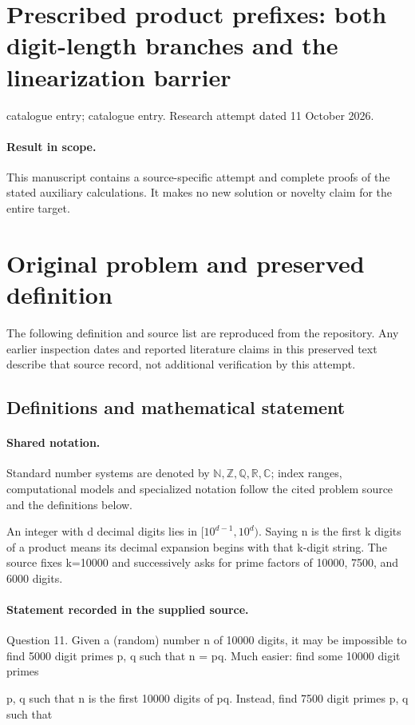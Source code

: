 \documentclass[11pt]{article}
\begin{document}
\section*{Prescribed product prefixes: both digit-length branches and the linearization barrier}
\noindent catalogue entry; catalogue entry. Research attempt dated 11 October 2026.
\paragraph{Result in scope.}This manuscript contains a source-specific attempt and complete proofs of the stated auxiliary calculations. It makes no new solution or novelty claim for the entire target.
\section{Original problem and preserved definition}
The following definition and source list are reproduced from the repository. Any earlier inspection dates and reported literature claims in this preserved text describe that source record, not additional verification by this attempt.
\subsection{Definitions and mathematical statement}

\paragraph{Shared notation.}Standard number systems are denoted by $\mathbb N,\mathbb Z,\mathbb Q,\mathbb R,\mathbb C$; index ranges, computational models and specialized notation follow the cited problem source and the definitions below.


An integer with d decimal digits lies in $[10^{d-1},10^d)$. Saying n is the first k digits of a product means its decimal expansion begins with that k-digit string. The source fixes k=10000 and successively asks for prime factors of 10000, 7500, and 6000 digits.
\paragraph{Statement recorded in the supplied source.}
Question 11. Given a (random) number n of 10000 digits, it may be impossible to find 5000 digit primes p, q such that n = pq. Much easier: find some 10000 digit primes

p, q such that n is the first 10000 digits of pq. Instead, find 7500 digit primes p, q such that
\end{document}
